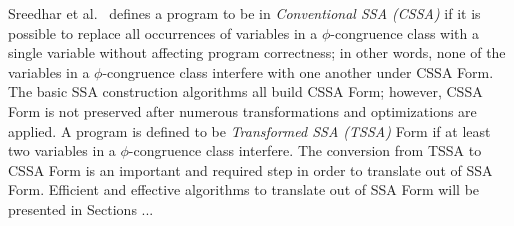 Sreedhar et al.~\cite{SreedharSep99} defines a program to be in 
\emph{Conventional SSA (CSSA)} if it is possible to replace all occurrences
of variables in a $\phi$-congruence class with a single variable without
affecting program correctness; in other words, none of the variables in
a $\phi$-congruence class interfere with one another under CSSA Form. 
The basic SSA construction algorithms all build CSSA Form; however, CSSA
Form is not preserved after numerous transformations and optimizations
are applied. A program is defined to be \emph{Transformed SSA (TSSA)}
Form if at least two variables in a $\phi$-congruence class interfere. 
The conversion from TSSA to CSSA Form is an important and required 
step in order to translate out of SSA Form. Efficient and effective algorithms
to translate out of SSA Form will be presented in Sections ... 

